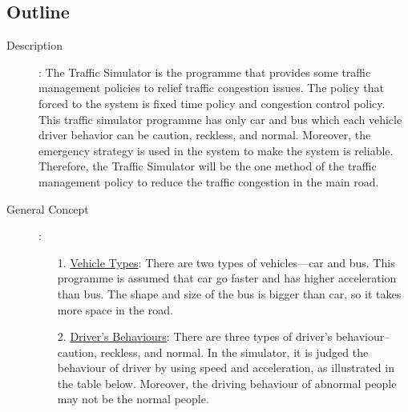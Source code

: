 \documentclass[11pt]{article}
\begin{document}
\subsection{Outline}
\begin{description}
\item[Description]:
The Traffic Simulator is the programme that provides some traffic management policies to relief traffic congestion issues. The policy that forced to the
system is fixed time policy and congestion control policy. This traffic simulator programme has only car and bus which each vehicle driver behavior can be caution, reckless, and normal. Moreover, the emergency strategy is used in the system to make the 	system is reliable. Therefore, the Traffic Simulator will be the one method of the traffic
management policy to reduce the traffic congestion in the main road. 
\item[General Concept]:
	\begin{itemize}
		\item[1. ]\underline{Vehicle Types}: There are two types of 	vehicles—car and bus. This programme is assumed that car go faster and has higher acceleration than bus. The shape and size of the bus is bigger than car, so it takes more space in the road.
		
		\item[2. ] \underline{Driver’s Behaviours}: There are three types of driver’s behaviour-- caution, reckless, and normal. In the simulator, it is judged the behaviour of driver by using speed and acceleration, as illustrated in the table below. Moreover, the driving behaviour of abnormal people may not be the normal people.


\end{itemize}
\end{description}
\end{document}
